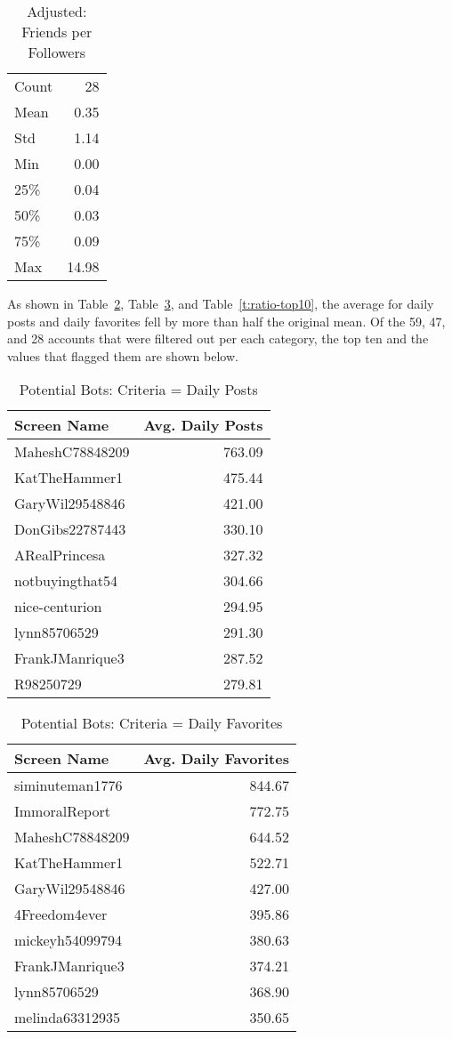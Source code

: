 \begin{table}[htb]
\centering
\caption{Adjusted: Friends per Followers}
\label{t:ratio-delta}
\begin{tabular}{lr}
Count & 28 \\
Mean  & 0.35  \\
Std   & 1.14  \\
Min   & 0.00  \\
25\%  & 0.04  \\
50\%  & 0.03  \\
75\%  & 0.09  \\
Max   & 14.98 
\end{tabular}
\end{table}

As shown in Table~\ref{t:post-top10}, Table~\ref{t:faves-top10}, and
Table~\ref{t:ratio-top10}, the average for daily posts and daily favorites fell
by more than half the original mean. Of the 59, 47, and 28 accounts that were
filtered out per each category, the top ten and the values that flagged them
are shown below.

\begin{table}[htb]
\centering
\caption{Potential Bots: Criteria = Daily Posts}
\label{t:post-top10}
\begin{tabular}{lr}
Screen Name & Avg. Daily Posts \\
\toprule
MaheshC78848209 & 763.09  \\
KatTheHammer1   & 475.44  \\
GaryWil29548846 & 421.00  \\
DonGibs22787443 & 330.10  \\
ARealPrincesa   & 327.32  \\
notbuyingthat54 & 304.66  \\
nice-centurion  & 294.95  \\
lynn85706529    & 291.30  \\
FrankJManrique3 & 287.52  \\
R98250729       & 279.81  
\end{tabular}
\end{table}

\begin{table}[htb]
\centering
\caption{Potential Bots: Criteria = Daily Favorites}
\label{t:faves-top10}
\begin{tabular}{lr}
Screen Name & Avg. Daily Favorites \\
\toprule
siminuteman1776 & 844.67 \\
ImmoralReport   & 772.75 \\
MaheshC78848209 & 644.52 \\
KatTheHammer1   & 522.71 \\
GaryWil29548846 & 427.00 \\
4Freedom4ever   & 395.86 \\
mickeyh54099794 & 380.63 \\
FrankJManrique3 & 374.21 \\
lynn85706529    & 368.90 \\
melinda63312935 & 350.65  
\end{tabular}
\end{table}

